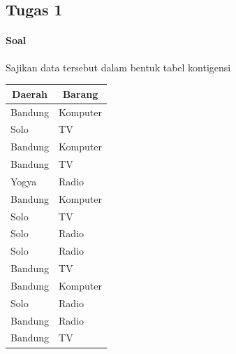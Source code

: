 \documentclass[a4paper,12pt]{article}
\begin{document}
\subsection{Tugas 1}
\paragraph{Soal\\}
Sajikan data tersebut dalam bentuk tabel kontigensi
\begin{table}[!ht]
	\begin{tabular}{|l|l|}
		\hline
		\multicolumn{1}{|c|}{Daerah} & \multicolumn{1}{c|}{Barang} \\ \hline
		Bandung                      & Komputer                    \\ \hline
		Solo                         & TV                          \\ \hline
		Bandung                      & Komputer                    \\ \hline
		Bandung                      & TV                          \\ \hline
		Yogya                        & Radio                       \\ \hline
		Bandung                      & Komputer                    \\ \hline
		Solo                         & TV                          \\ \hline
		Solo                         & Radio                       \\ \hline
		Solo                         & Radio                       \\ \hline
		Bandung                      & TV                          \\ \hline
		Bandung                      & Komputer                    \\ \hline
		Solo                         & Radio                       \\ \hline
		Bandung                      & Radio                       \\ \hline
		Bandung                      & TV                          \\ \hline
	\end{tabular}
\end{table}
\end{document}
